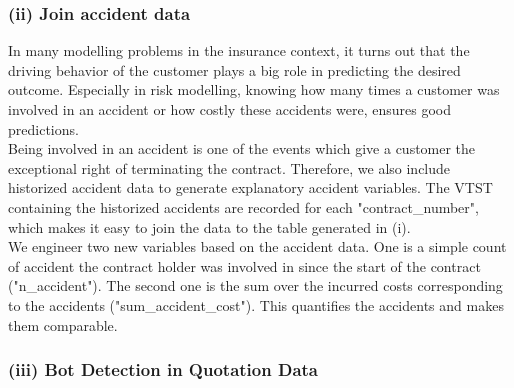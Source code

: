 \documentclass[12pt,titlepage]{article}
\begin{document}
\subsubsection*{(ii) Join accident data}
In many modelling problems in the insurance context, it turns out that the driving behavior of the customer plays a big role in predicting the desired outcome. Especially in risk modelling, knowing how many times a customer was involved in an accident or how costly these accidents were, ensures good predictions. \\
Being involved in an accident is one of the events which give a customer the exceptional right of terminating the contract. Therefore, we also include historized accident data to generate explanatory accident variables. The VTST containing the historized accidents are recorded for each "contract\_number", which makes it easy to join the data to the table generated in (i). \\
We engineer two new variables based on the accident data. One is a simple count of accident the contract holder was involved in since the start of the contract ("n\_accident"). The second one is the sum over the incurred costs corresponding to the accidents ("sum\_accident\_cost"). This quantifies the accidents and makes them comparable. \\


\subsubsection*{(iii) Bot Detection in Quotation Data}
\end{document}
